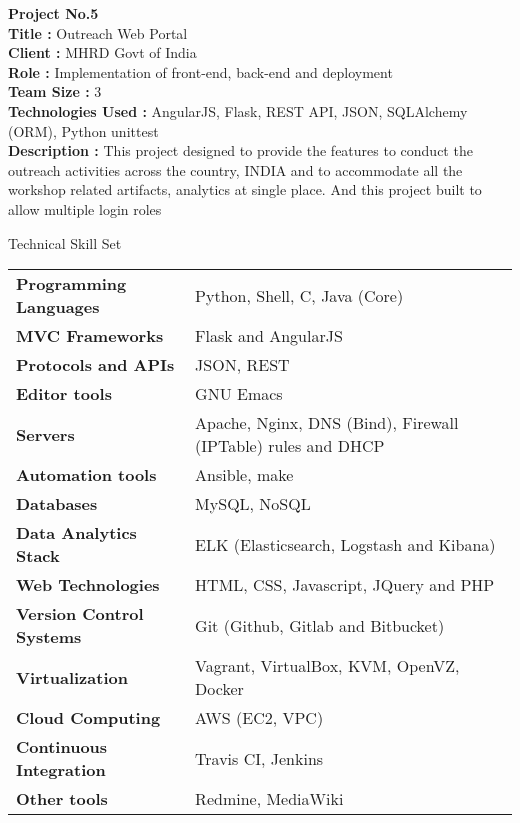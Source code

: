 \documentclass{resume} %
\begin{document}
\bigskip
\textbf {Project No.5} \\ \textbf{Title : } Outreach Web
Portal\\ \textbf{Client : } MHRD Govt of India \\ \textbf{Role : }
Implementation of front-end, back-end and deployment \\ \textbf{Team
  Size : } 3 \\ \textbf{Technologies Used :} AngularJS, Flask, REST
API, JSON, SQLAlchemy (ORM), Python unittest \\ \textbf{Description :}
This project designed to provide the features to conduct the
outreach activities across the country, INDIA and to accommodate all
the workshop related artifacts, analytics at single place. And this
project built to allow multiple login roles \\



\begin{rSection}
  {Technical Skill Set}

  \begin{tabular}{ @{} >{\bfseries}l @{\hspace{2ex}} l }
    Programming Languages & Python, Shell, C, Java (Core)
    \\ MVC Frameworks & Flask and AngularJS\\ Protocols and
    APIs & JSON, REST \\ Editor tools & GNU Emacs \\ Servers
    & Apache, Nginx, DNS (Bind), Firewall (IPTable) rules
    and DHCP \\ Automation tools & Ansible, make
    \\ Databases & MySQL, NoSQL \\ Data Analytics Stack &
    ELK (Elasticsearch, Logstash and Kibana) \\ Web
    Technologies & HTML, CSS, Javascript, JQuery and PHP
    \\ Version Control Systems & Git (Github, Gitlab and
    Bitbucket) \\ Virtualization & Vagrant, VirtualBox, KVM,
    OpenVZ, Docker \\ Cloud Computing & AWS (EC2, VPC)
    \\ Continuous Integration & Travis CI, Jenkins \\ Other
    tools & Redmine, MediaWiki
    
  \end{tabular}

\end{rSection}
\end{document}

